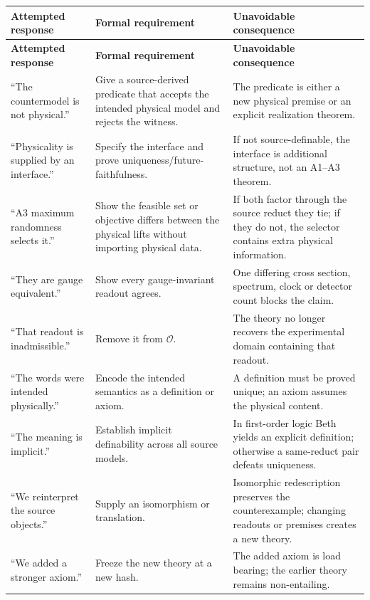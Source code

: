 \documentclass[10pt,a4paper]{article}
\theoremstyle{definition}
\theoremstyle{remark}
\newcommand{\Obs}{\mathcal O}
\begin{document}
\begin{longtable}{>{\raggedright\arraybackslash}p{}>{\raggedright\arraybackslash}p{}>{\raggedright\arraybackslash}p{}}
\toprule
\textbf{Attempted response} & \textbf{Formal requirement} & \textbf{Unavoidable consequence}\\
\midrule
\endfirsthead
\toprule
\textbf{Attempted response} & \textbf{Formal requirement} & \textbf{Unavoidable consequence}\\
\midrule
\endhead
``The countermodel is not physical.'' & Give a source-derived predicate that accepts the intended physical model and rejects the witness. & The predicate is either a new physical premise or an explicit realization theorem.\\
\addlinespace
``Physicality is supplied by an interface.'' & Specify the interface and prove uniqueness/future-faithfulness. & If not source-definable, the interface is additional structure, not an A1--A3 theorem.\\
\addlinespace
``A3 maximum randomness selects it.'' & Show the feasible set or objective differs between the physical lifts without importing physical data. & If both factor through the source reduct they tie; if they do not, the selector contains extra physical information.\\
\addlinespace
``They are gauge equivalent.'' & Show every gauge-invariant readout agrees. & One differing cross section, spectrum, clock or detector count blocks the claim.\\
\addlinespace
``That readout is inadmissible.'' & Remove it from \(\Obs\). & The theory no longer recovers the experimental domain containing that readout.\\
\addlinespace
``The words were intended physically.'' & Encode the intended semantics as a definition or axiom. & A definition must be proved unique; an axiom assumes the physical content.\\
\addlinespace
``The meaning is implicit.'' & Establish implicit definability across all source models. & In first-order logic Beth yields an explicit definition; otherwise a same-reduct pair defeats uniqueness.\\
\addlinespace
``We reinterpret the source objects.'' & Supply an isomorphism or translation. & Isomorphic redescription preserves the counterexample; changing readouts or premises creates a new theory.\\
\addlinespace
``We added a stronger axiom.'' & Freeze the new theory at a new hash. & The added axiom is load bearing; the earlier theory remains non-entailing.\\

\end{longtable}
\end{document}
